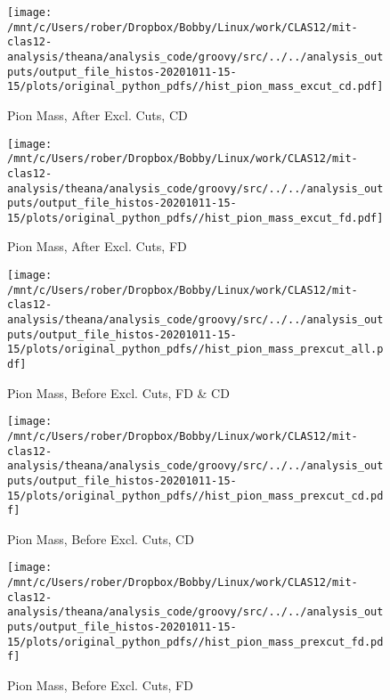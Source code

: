 \documentclass{article}
\begin{document}
\begin{landscape}
    \begin{figure}[h]
        \centering

        \texttt{[image: /mnt/c/Users/rober/Dropbox/Bobby/Linux/work/CLAS12/mit-clas12-analysis/theana/analysis\_code/groovy/src/../../analysis\_outputs/output\_file\_histos-20201011-15-15/plots/original\_python\_pdfs//hist\_pion\_mass\_excut\_cd.pdf]}
        \captionsetup{textformat=empty,labelformat=blank}
        \caption{Pion Mass, After Excl. Cuts, CD}
    \end{figure}
    \clearpage
    
    \begin{figure}[h]
        \centering

        \texttt{[image: /mnt/c/Users/rober/Dropbox/Bobby/Linux/work/CLAS12/mit-clas12-analysis/theana/analysis\_code/groovy/src/../../analysis\_outputs/output\_file\_histos-20201011-15-15/plots/original\_python\_pdfs//hist\_pion\_mass\_excut\_fd.pdf]}
        \captionsetup{textformat=empty,labelformat=blank}
        \caption{Pion Mass, After Excl. Cuts, FD}
    \end{figure}
    \clearpage
    
    \begin{figure}[h]
        \centering

        \texttt{[image: /mnt/c/Users/rober/Dropbox/Bobby/Linux/work/CLAS12/mit-clas12-analysis/theana/analysis\_code/groovy/src/../../analysis\_outputs/output\_file\_histos-20201011-15-15/plots/original\_python\_pdfs//hist\_pion\_mass\_prexcut\_all.pdf]}
        \captionsetup{textformat=empty,labelformat=blank}
        \caption{Pion Mass, Before Excl. Cuts, FD \& CD}
    \end{figure}
    \clearpage
    
    \begin{figure}[h]
        \centering

        \texttt{[image: /mnt/c/Users/rober/Dropbox/Bobby/Linux/work/CLAS12/mit-clas12-analysis/theana/analysis\_code/groovy/src/../../analysis\_outputs/output\_file\_histos-20201011-15-15/plots/original\_python\_pdfs//hist\_pion\_mass\_prexcut\_cd.pdf]}
        \captionsetup{textformat=empty,labelformat=blank}
        \caption{Pion Mass, Before Excl. Cuts, CD}
    \end{figure}
    \clearpage
    
    \begin{figure}[h]
        \centering

        \texttt{[image: /mnt/c/Users/rober/Dropbox/Bobby/Linux/work/CLAS12/mit-clas12-analysis/theana/analysis\_code/groovy/src/../../analysis\_outputs/output\_file\_histos-20201011-15-15/plots/original\_python\_pdfs//hist\_pion\_mass\_prexcut\_fd.pdf]}
        \captionsetup{textformat=empty,labelformat=blank}
        \caption{Pion Mass, Before Excl. Cuts, FD}
    \end{figure}
    \clearpage
    

\end{landscape}
\end{document}
